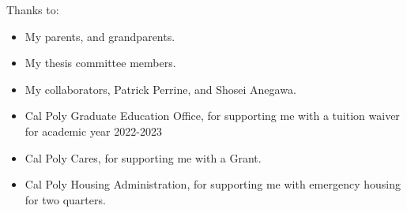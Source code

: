 \noindent
Thanks to:
\begin{itemize}
    \item My parents, and grandparents.
    \item My thesis committee members.
    \item My collaborators, Patrick Perrine, and Shosei Anegawa.
    \item Cal Poly Graduate Education Office, for supporting me with a tuition waiver for academic year 2022-2023
    \item Cal Poly Cares, for supporting me with a Grant. 
    \item Cal Poly Housing Administration, for supporting me with emergency housing for two quarters.
\end{itemize}
